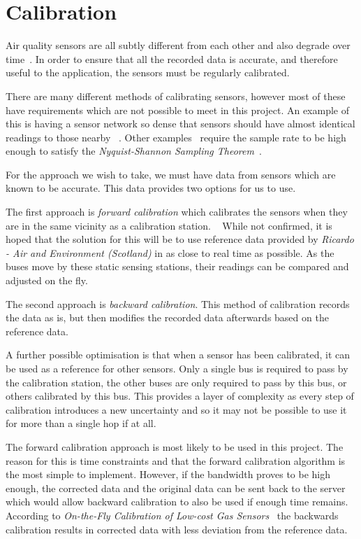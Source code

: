 \section{Calibration}\label{calibration}

Air quality sensors are all subtly different from each other and also degrade over time~\cite{ontheflycalibration}. In order to ensure that all the recorded data is accurate, and therefore useful to the application, the sensors must be regularly calibrated. 

There are many different methods of calibrating sensors, however most of these have requirements which are not possible to meet in this project. An example of this is having a sensor network so dense that sensors should have almost identical readings to those nearby ~\cite{collaborativeinplacecalibration}. Other examples~\cite{blindcalibration} require the sample rate to be high enough to satisfy the \emph{Nyquist-Shannon Sampling Theorem}~\cite{samplingtheoremorigins}. 

For the approach we wish to take, we must have data from sensors which are known to be accurate. This data provides two options for us to use. 

The first approach is \emph{forward calibration} which calibrates the sensors when they are in the same vicinity as a calibration station. ~\cite{ontheflycalibration} While not confirmed, it is hoped that the solution for this will be to use reference data provided by \emph{Ricardo - Air and Environment (Scotland)} in as close to real time as possible. As the buses move by these static sensing stations, their readings can be compared and adjusted on the fly. 

The second approach is \emph{backward calibration}. This method of calibration records the data as is, but then modifies the recorded data afterwards based on the reference data. 

A further possible optimisation is that when a sensor has been calibrated, it can be used as a reference for other sensors. Only a single bus is required to pass by the calibration station, the other buses are only required to pass by this bus, or others calibrated by this bus. This provides a layer of complexity as every step of calibration introduces a new uncertainty and so it may not be possible to use it for more than a single hop if at all. 

The forward calibration approach is most likely to be used in this project. The reason for this is time constraints and that the forward calibration algorithm is the most simple to implement. However, if the bandwidth proves to be high enough, the corrected data and the original data can be sent back to the server which would allow backward calibration to also be used if enough time remains. According to \emph{On-the-Fly Calibration of Low-cost Gas Sensors}~\cite{ontheflycalibration} the backwards calibration results in corrected data with less deviation from the reference data. 

